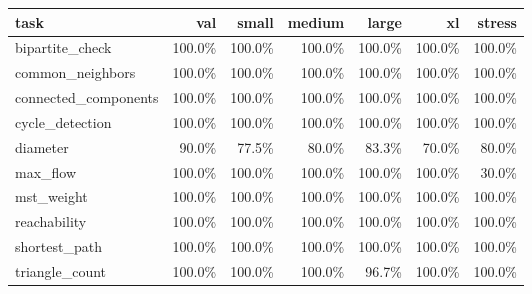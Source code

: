 \begin{tabular}{lrrrrrr}
\toprule
task & val & small & medium & large & xl & stress \\
\midrule
bipartite\_check & 100.0\% & 100.0\% & 100.0\% & 100.0\% & 100.0\% & 100.0\% \\
common\_neighbors & 100.0\% & 100.0\% & 100.0\% & 100.0\% & 100.0\% & 100.0\% \\
connected\_components & 100.0\% & 100.0\% & 100.0\% & 100.0\% & 100.0\% & 100.0\% \\
cycle\_detection & 100.0\% & 100.0\% & 100.0\% & 100.0\% & 100.0\% & 100.0\% \\
diameter & 90.0\% & 77.5\% & 80.0\% & 83.3\% & 70.0\% & 80.0\% \\
max\_flow & 100.0\% & 100.0\% & 100.0\% & 100.0\% & 100.0\% & 30.0\% \\
mst\_weight & 100.0\% & 100.0\% & 100.0\% & 100.0\% & 100.0\% & 100.0\% \\
reachability & 100.0\% & 100.0\% & 100.0\% & 100.0\% & 100.0\% & 100.0\% \\
shortest\_path & 100.0\% & 100.0\% & 100.0\% & 100.0\% & 100.0\% & 100.0\% \\
triangle\_count & 100.0\% & 100.0\% & 100.0\% & 96.7\% & 100.0\% & 100.0\% \\
\bottomrule
\end{tabular}
